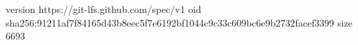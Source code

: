 version https://git-lfs.github.com/spec/v1
oid sha256:91211af7f84165d43b8eec5f7e6192bf1044c9c33c609bc6e9b2732facef3399
size 6693
